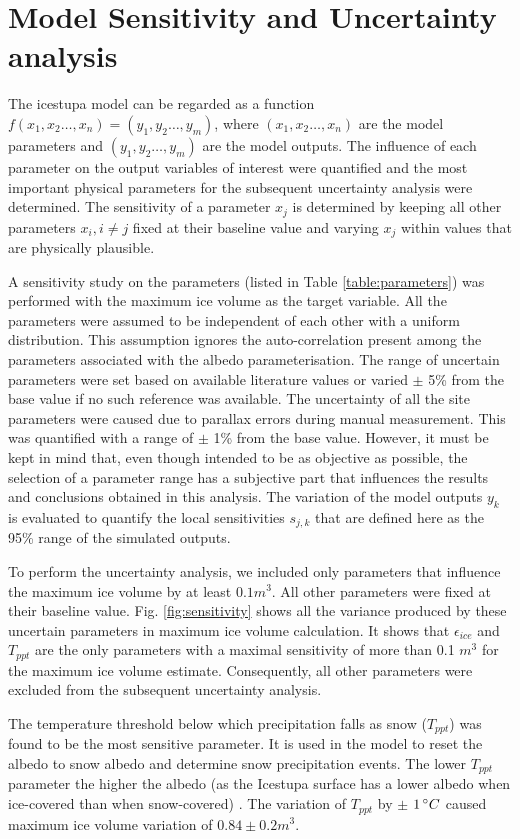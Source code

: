 \documentclass[utf8]{frontiersSCNS} %
\begin{document}
\section{Model Sensitivity and Uncertainty analysis}

The icestupa model can be regarded as a function $f(x_1,x_2 \dots, x_n) = (y_1,y_2 \dots, y_m)$, where $(x_1,x_2
\dots, x_n)$ are the model parameters and $(y_1,y_2 \dots, y_m)$ are the model outputs. The influence of each
parameter on the output variables of interest were quantified and the most important physical parameters for the
subsequent uncertainty analysis were determined. The sensitivity of a parameter $x_j$ is determined by keeping all
other parameters $x_i, i \neq j$ fixed at their baseline value and varying $x_j$ within values that are physically
plausible.

A sensitivity study on the parameters (listed in Table \ref{table:parameters}) was performed with the maximum ice
volume as the target variable. All the parameters were assumed to be independent of each other with a uniform
distribution.  This assumption ignores the auto-correlation present among the parameters associated with the albedo
parameterisation.  The range of uncertain parameters were set based on available literature values or varied $\pm$ 5\%
from the base value if no such reference was available. The uncertainty of all the site parameters were caused due to
parallax errors during manual measurement. This was quantified with a range of $\pm$ 1\% from the base value. However,
it must be kept in mind that, even though intended to be as objective as possible, the selection of a parameter range
has a subjective part that influences the results and conclusions obtained in this analysis.  The variation of the
model outputs $y_k$ is evaluated to quantify the local sensitivities $s_{j,k}$ that are defined here as the 95\% range
of the simulated outputs.

To perform the uncertainty analysis, we included only parameters that influence the maximum ice volume by at least $0.1
m^3$. All other parameters were fixed at their baseline value.  Fig. \ref{fig:sensitivity} shows all the variance
produced by these uncertain parameters in maximum ice volume calculation. It shows that $\epsilon_{ice}$ and $T_{ppt}$ 
are the only parameters with a maximal sensitivity of more than 0.1 $m^3$ for the maximum ice volume estimate.
Consequently, all other parameters were excluded from the subsequent uncertainty analysis. 

The temperature threshold below which precipitation falls as snow ($T_{ppt}$) was found to be the most sensitive
parameter. It is used in the model to reset the albedo to snow albedo and determine snow precipitation events. The
lower $T_{ppt}$ parameter the higher the albedo (as the Icestupa surface has a lower albedo when ice-covered than when
snow-covered) . The variation of $T_{ppt}$ by $\pm$ $1\,\degree C$ caused maximum ice volume variation of $0.84 \pm 0.2
m^3$. 
\end{document}
